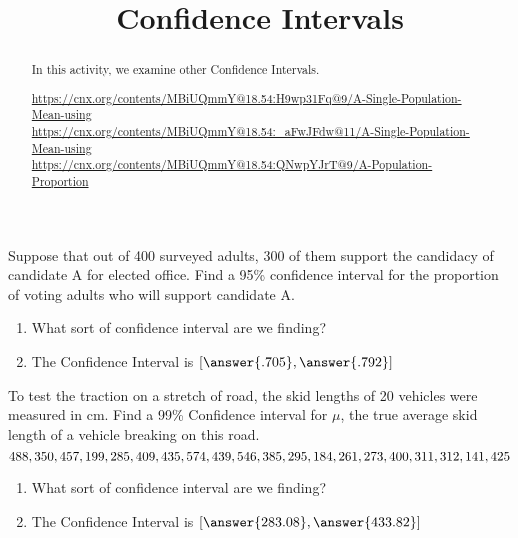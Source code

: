 \documentclass{ximera}
\title{Confidence Intervals}
\begin{document}
      
\begin{abstract}
      
In this activity, we examine other Confidence Intervals.

\url{https://cnx.org/contents/MBiUQmmY@18.54:H9wp31Fq@9/A-Single-Population-Mean-using}\\
\url{https://cnx.org/contents/MBiUQmmY@18.54:_aFwJFdw@11/A-Single-Population-Mean-using}\\
\url{https://cnx.org/contents/MBiUQmmY@18.54:QNwpYJrT@9/A-Population-Proportion} 
      
\end{abstract}
      
\maketitle
 

\begin{problem}
Suppose that out of 400 surveyed adults, 300 of them support the candidacy of candidate A for elected office. Find a 95\% confidence interval for the proportion of voting adults who will support candidate A.

\begin{enumerate}
\item What sort of confidence interval are we finding?

\begin{multipleChoice}
\end{multipleChoice}

\item The Confidence Interval is $[\answer{.705}, \answer{.792}]$

\end{enumerate}



\end{problem}






\begin{problem}
To test the traction on a stretch of road, the skid lengths of 20 vehicles  were measured in cm.  Find a 99\% Confidence interval for $\mu$, the true average skid length of a vehicle breaking on this road.
$$488, 350, 457, 199, 285, 409, 435, 574, 439, 546,\\
385, 295, 184, 261, 273, 400, 311, 312, 141, 425$$


\begin{enumerate}
\item What sort of confidence interval are we finding?

\begin{multipleChoice}
\end{multipleChoice}

\item The Confidence Interval is $[\answer{283.08}, \answer{433.82}]$

\end{enumerate}


\end{problem}
\end{document}
